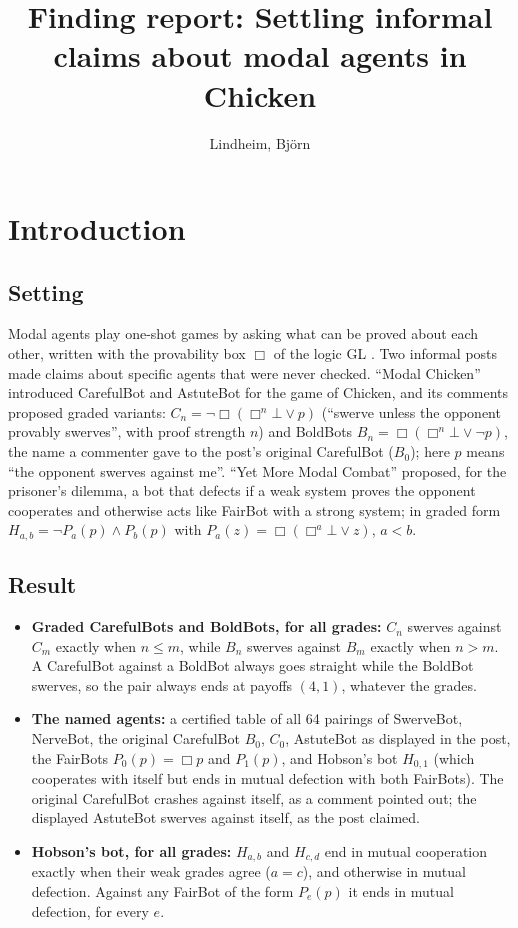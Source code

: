 \documentclass{article}
\title{Finding report: Settling informal claims about modal agents in Chicken}
\author{Lindheim, Björn}
\date{}
\begin{document}
\maketitle
\section{Introduction}
\label{sec:chicken-informal-claims}

\subsection*{Setting}

Modal agents play one-shot games by asking what can be proved about each other, written with the
provability box $\Box$ of the logic GL \cite{barasz2014robust}. Two informal posts made claims about
specific agents that were never checked. ``Modal Chicken'' \cite{gramstone2015chicken} introduced
CarefulBot and AstuteBot for the game of Chicken, and its comments proposed graded variants:
$C_n = \neg\Box(\Box^n\bot \vee p)$ (``swerve unless the opponent provably swerves'', with proof
strength $n$) and BoldBots $B_n = \Box(\Box^n\bot \vee \neg p)$, the name a commenter gave to the
post's original CarefulBot ($B_0$); here $p$ means ``the opponent swerves against me''. ``Yet More Modal Combat'' \cite{hobson2021modal} proposed, for the prisoner's
dilemma, a bot that defects if a weak system proves the opponent cooperates and otherwise acts like
FairBot with a strong system; in graded form $H_{a,b} = \neg P_a(p) \wedge P_b(p)$ with
$P_a(z) = \Box(\Box^a\bot \vee z)$, $a < b$.

\subsection*{Result}

\begin{itemize}
\item \textbf{Graded CarefulBots and BoldBots, for all grades:} $C_n$ swerves against $C_m$ exactly when $n \le m$, while $B_n$ swerves against $B_m$ exactly when $n > m$. A CarefulBot against a BoldBot always goes straight while the BoldBot swerves, so the pair always ends at payoffs $(4, 1)$, whatever the grades.
\item \textbf{The named agents:} a certified table of all 64 pairings of SwerveBot, NerveBot, the original CarefulBot $B_0$, $C_0$, AstuteBot as displayed in the post, the FairBots $P_0(p) = \Box p$ and $P_1(p)$, and Hobson's bot $H_{0,1}$ (which cooperates with itself but ends in mutual defection with both FairBots). The original CarefulBot crashes against itself, as a comment pointed out; the displayed AstuteBot swerves against itself, as the post claimed.
\item \textbf{Hobson's bot, for all grades:} $H_{a,b}$ and $H_{c,d}$ end in mutual cooperation exactly when their weak grades agree ($a = c$), and otherwise in mutual defection. Against any FairBot of the form $P_e(p)$ it ends in mutual defection, for every $e$.
\end{itemize}
\end{document}
